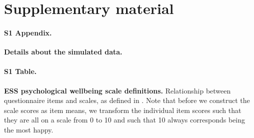\documentclass[a4paper,14pt]{article}
\begin{document}
\section*{Supplementary material}


\paragraph*{S1 Appendix.}
\label{appendix.simData}
{\bf Details about the simulated data.}


\paragraph*{S1 Table.}
\label{table:items}
{\bf ESS psychological wellbeing scale definitions.} Relationship between questionnaire items and scales, as defined in \cite{ESStopline5}. Note that before we construct the scale scores as item means, we transform the individual item scores such that they are all on a scale from 0 to 10 and such that 10 always corresponds being the most happy.


\newpage



\end{document}

